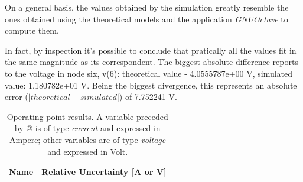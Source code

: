 On a general basis, the values obtained by the simulation greatly resemble the ones obtained using the theoretical models and the application \textit{GNUOctave} to compute them.

In fact, by inspection it's possible to conclude that pratically all the values fit in the same magnitude as its correspondent. The biggest absolute difference reports to the voltage in node six, v(6): theoretical value - 4.0555787e+00 V, simulated value: 1.180782e+01 V. Being the biggest divergence, this represents an absolute error ($|theoretical - simulated|$) of 7.752241 V.

\begin{table}[htb!]
  \centering
  \begin{tabular}{|l|r|}
    \hline    
    {\bf Name} & {\bf Relative Uncertainty [A or V]} \\ \hline
    
  \end{tabular}
  \caption{Operating point results. A variable preceded by @ is of type {\em current}
    and expressed in Ampere; other variables are of type {\it voltage} and expressed in
    Volt.}
  \label{tab:errors}
\end{table}